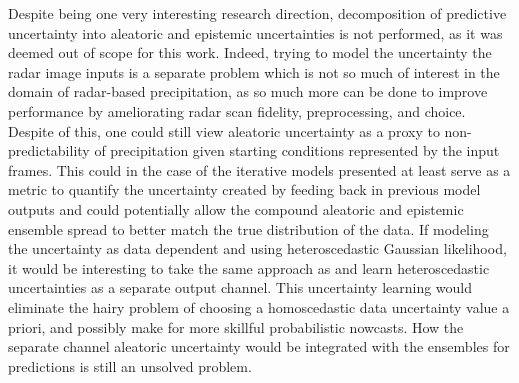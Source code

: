 Despite being one very interesting research direction, decomposition of predictive uncertainty into aleatoric and epistemic uncertainties is not performed, as it was deemed out of scope for this work. Indeed, trying to model the uncertainty the radar image inputs is a separate problem which is not so much of interest in the domain of radar-based precipitation, as so much more can be done to improve performance by ameliorating radar scan fidelity, preprocessing, and choice. Despite of this, one could still view aleatoric uncertainty as a proxy to non-predictability of precipitation given starting conditions represented by the input frames. This could in the case of the iterative models presented at least serve as a metric to quantify the uncertainty created by feeding back in previous model outputs and could potentially allow the compound aleatoric and epistemic ensemble spread to better match the true distribution of the data. If modeling the uncertainty as data dependent and using heteroscedastic Gaussian likelihood, it would be interesting to take the same approach as \citet{kendall_what_2017} and learn heteroscedastic uncertainties as a separate output channel. This uncertainty learning would eliminate the hairy problem of choosing a homoscedastic data uncertainty value a priori, and possibly make for more skillful probabilistic nowcasts. How the separate channel aleatoric uncertainty would be integrated with the ensembles for predictions is still an unsolved problem. 

